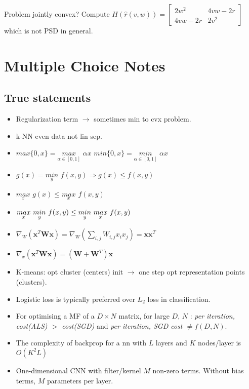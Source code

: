 Problem jointly convex? Compute $H(\hat{r}({v,w})) = \begin{bmatrix} 2w^2 & 4vw-2r \\ 4vw-2r & 2v^2 \end{bmatrix}$ which is not PSD in general.


\section{Multiple Choice Notes}
\subsection{True statements}
\begin{itemize}
\item Regularization term $\rightarrow$ sometimes min to cvx problem.
\item k-NN even data not lin sep.
\item $max\{ 0, x\} = \underset{{\alpha \in [0,1]}}{max} \,\, \alpha x$ \newline $min\{ 0, x\} = \underset{{\alpha \in [0,1]}}{min}\,\,  \alpha x$
\item $g(x) = \underset{y}{min}\,\, f(x,y) \Rightarrow g(x) \le f(x,y)$
\item $\underset{x}{max}\,\, g(x) \le \underset{x}{max} \,\,f(x,y)$ \newline
\item $\underset{x}{max} \,\, \underset{y}{min} \,\, f(x,y) \newline \le \underset{y}{min} \,\, \underset{x}{max} \,\, f(x,y)$\newline
\item $\nabla_{W} (\mathbf{x}^T\mathbf{W}\mathbf{x}) = \nabla_{W} (\sum_{i,j}W_{i,j}x_ix_j) = \mathbf{x}\mathbf{x}^T$
\item $\nabla_{x} (\mathbf{x}^T\mathbf{W}\mathbf{x}) = (\mathbf{W}+\mathbf{W}^T)\mathbf{x}$
\item K-means: opt cluster (centers) init $\rightarrow$ one step opt representation points (clusters).
\item Logistic loss is typically preferred over $L_2$ loss in classification.
\item For optimising a MF of a $D\times N$ matrix, for large $D$, $N$ : \textit{per iteration, cost(ALS) $>$ cost(SGD)} and \textit{per iteration, SGD cost $\neq f(D, N)$}.
\item The complexity of backprop for a nn with $L$ layers and $K$ nodes/layer is $O(K^2L)$
\item One-dimensional CNN with filter/kernel $M$ non-zero terms. Without bias terms, $M$ parameters per layer.
\end{itemize}

